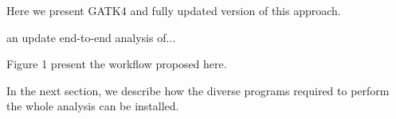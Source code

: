 \documentclass[]{article}
\begin{document}
Here we present GATK4 and fully updated version of this approach.

an update end-to-end analysis of...



Figure 1 present the workflow proposed here.









In the next section, we describe how the diverse programs required to perform the whole analysis can be installed.







\end{document}
